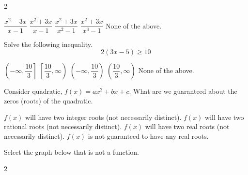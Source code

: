 \begin{questions}
\begin{multicols}{2}
    
\begin{checkboxes}
    \choice $\dfrac{x^2-3x}{x-1}$
    \choice $\dfrac{x^2+3x}{x-1}$
    \choice $\dfrac{x^2+3x}{x^2-1}$
    \choice $\dfrac{x^2+3x}{x^3-1}$
    \choice None of the above.
\end{checkboxes}
\end{multicols}

\question[2] Solve the following inequality.
\[
2(3x-5)\geq 10
\]
\begin{checkboxes}
    \choice $\left(-\infty,\dfrac{10}{3}\right]$
    \choice $\left[\dfrac{10}{3},\infty\right)$
    \choice $\left(-\infty,\dfrac{10}{3}\right)$
    \choice $\left(\dfrac{10}{3},\infty\right)$
    \choice None of the above.
\end{checkboxes}
\newpage

\question[2] Consider quadratic, $f(x)=ax^2+bx+c$. What are we guaranteed about the zeros (roots) of the quadratic.
\begin{checkboxes}
    \choice $f(x)$ will have two integer roots (not necessarily distinct).
    \choice $f(x)$ will have two rational roots (not necessarily distinct).
    \choice $f(x)$ will have two real roots (not necessarily distinct).
    \choice $f(x)$ is not guaranteed to have any real roots.
\end{checkboxes}

\question[2] Select the graph below that is not a function.
\begin{multicols}{2}
    

\begin{checkboxes}
    \choice \phantom{a}\vspace{-.7cm}
    
\end{checkboxes}
\end{multicols}
\end{questions}
